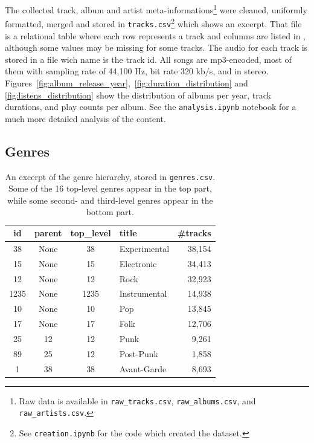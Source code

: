 \documentclass{article}
\newcommand{\todo}[1]{{\color{red} #1}}
\begin{document}
The collected track, album and artist meta-informations\footnote{Raw data is available in \texttt{raw\_tracks.csv}, \texttt{raw\_albums.csv}, and \texttt{raw\_artists.csv}.} were cleaned, uniformly formatted, merged and stored in \texttt{tracks.csv}\footnote{\label{creation}See \texttt{creation.ipynb} for the code which created the dataset.} which  shows an excerpt. That file is a relational table where each row represents a track and columns are listed in , although some values may be missing for some tracks. The audio for each track is stored in a file wich name is the track id. All songs are mp3-encoded, most of them with sampling rate of 44,100 Hz, bit rate 320 kb/s, and in stereo. Figures~\ref{fig:album_release_year},~\ref{fig:duration_distribution} and \ref{fig:listens_distribution} show the distribution of albums per year, track durations, and play counts per album.
See the \texttt{analysis.ipynb} notebook for a much more detailed analysis of the content.


\subsection{Genres}

\begin{table}
	\centering
	\begin{tabular}{ccclr}
		\toprule
		id & parent & top\_level & title & \#tracks \\
		\midrule
		38 & None & 38 & Experimental & 38,154 \\
		15 & None & 15 & Electronic & 34,413 \\
		12 & None & 12 & Rock & 32,923 \\
		1235 & None & 1235 & Instrumental & 14,938 \\
		10 & None & 10 & Pop & 13,845 \\
		17 & None & 17 & Folk & 12,706 \\
		\midrule
		25 & 12 & 12 & Punk & 9,261 \\
		89 & 25 & 12 & Post-Punk & 1,858 \\
		1  & 38 & 38 & Avant-Garde & 8,693 \\
		\bottomrule
	\end{tabular}
	\caption{An excerpt of the genre hierarchy, stored in \texttt{genres.csv}. Some of the 16 top-level genres appear in the top part, while some second- and third-level genres appear in the bottom part.}
	\label{tab:genres}
\end{table}
\end{document}
